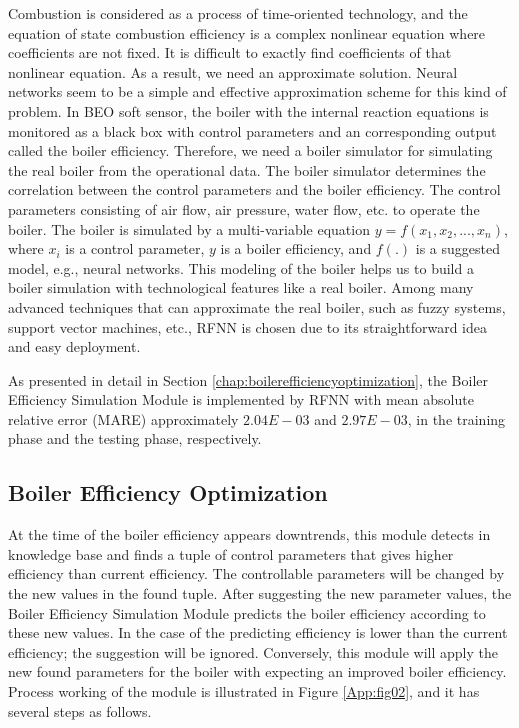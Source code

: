 Combustion is considered as a process of time-oriented technology, and the equation of state combustion efficiency is a complex nonlinear equation where coefficients are not fixed. It is difficult to exactly find coefficients of that nonlinear equation. As a result, we need an approximate solution. Neural networks seem to be a simple and effective approximation scheme for this kind of problem. In BEO soft sensor, the boiler with the internal reaction equations is monitored as a black box with control parameters and an corresponding output called the boiler efficiency. Therefore, we need a boiler simulator for simulating the real boiler from the operational data. The boiler simulator determines the correlation between the control parameters and the boiler efficiency. The control parameters consisting of air flow, air pressure, water flow, etc. to operate the boiler. The boiler is simulated by a multi-variable equation $y = f(x_1, x_2, ..., x_n)$, where $x_i$ is a control parameter, $y$ is a boiler efficiency, and $f(.)$ is a suggested model, e.g., neural networks. This modeling of the boiler helps us to build a boiler simulation with technological features like a real boiler. Among many advanced techniques that can approximate the real boiler, such as fuzzy systems, support vector machines, etc., RFNN is chosen due to its straightforward idea and easy deployment.

As presented in detail in Section \ref{chap:boilerefficiencyoptimization}, the Boiler Efficiency Simulation Module is implemented by RFNN with mean absolute relative error (MARE) approximately $2.04E-03$ and $2.97E-03$, in the training phase and the testing phase, respectively.

\subsection{Boiler Efficiency Optimization}

At the time of the boiler efficiency appears downtrends, this module detects in knowledge base and finds a tuple of control parameters that gives higher efficiency than current efficiency. The controllable parameters will be changed by the new values in the found tuple. After suggesting the new parameter values, the Boiler Efficiency Simulation Module predicts the boiler efficiency according to these new values. In the case of the predicting efficiency is lower than the current efficiency; the suggestion will be ignored. Conversely, this module will apply the new found parameters for the boiler with expecting an improved boiler efficiency. Process working of the module is illustrated in Figure \ref{App:fig02}, and it has several steps as follows.

